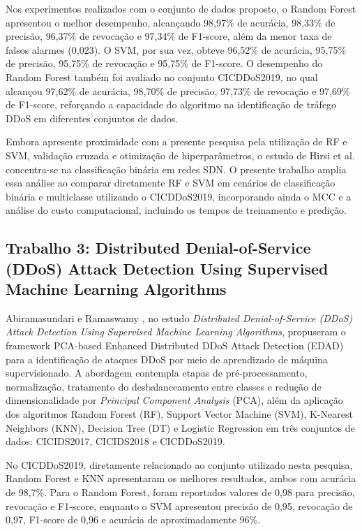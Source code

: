 \documentclass[
    12pt,                %
    openright,           %
    oneside,             %
    a4paper,             %
    english,             %
    brazil               %
]{abntex2}
\begin{document}
Nos experimentos realizados com o conjunto de dados proposto, o Random Forest apresentou o melhor desempenho, alcançando 98,97\% de acurácia, 98,33\% de precisão, 96,37\% de revocação e 97,34\% de F1-score, além da menor taxa de falsos alarmes (0,023). O SVM, por sua vez, obteve 96,52\% de acurácia, 95,75\% de precisão, 95,75\% de revocação e 95,75\% de F1-score. O desempenho do Random Forest também foi avaliado no conjunto CICDDoS2019, no qual alcançou 97,62\% de acurácia, 98,70\% de precisão, 97,73\% de revocação e 97,69\% de F1-score, reforçando a capacidade do algoritmo na identificação de tráfego DDoS em diferentes conjuntos de dados.

Embora apresente proximidade com a presente pesquisa pela utilização de RF e SVM, validação cruzada e otimização de hiperparâmetros, o estudo de Hirsi et al. \cite{hirsi2024} concentra-se na classificação binária em redes SDN. O presente trabalho amplia essa análise ao comparar diretamente RF e SVM em cenários de classificação binária e multiclasse utilizando o CICDDoS2019, incorporando ainda o MCC e a análise do custo computacional, incluindo os tempos de treinamento e predição.

\subsection{Trabalho 3: Distributed Denial-of-Service (DDoS) Attack Detection Using Supervised Machine Learning Algorithms}

Abiramasundari e Ramaswamy \cite{abiramasundari2025}, no estudo \textit{Distributed Denial-of-Service (DDoS) Attack Detection Using Supervised Machine Learning Algorithms}, propuseram o framework PCA-based Enhanced Distributed DDoS Attack Detection (EDAD) para a identificação de ataques DDoS por meio de aprendizado de máquina supervisionado. A abordagem contempla etapas de pré-processamento, normalização, tratamento do desbalanceamento entre classes e redução de dimensionalidade por \textit{Principal Component Analysis} (PCA), além da aplicação dos algoritmos Random Forest (RF), Support Vector Machine (SVM), K-Nearest Neighbors (KNN), Decision Tree (DT) e Logistic Regression em três conjuntos de dados: CICIDS2017, CICIDS2018 e CICDDoS2019.

No CICDDoS2019, diretamente relacionado ao conjunto utilizado nesta pesquisa, Random Forest e KNN apresentaram os melhores resultados, ambos com acurácia de 98,7\%. Para o Random Forest, foram reportados valores de 0,98 para precisão, revocação e F1-score, enquanto o SVM apresentou precisão de 0,95, revocação de 0,97, F1-score de 0,96 e acurácia de aproximadamente 96\%.
\end{document}
